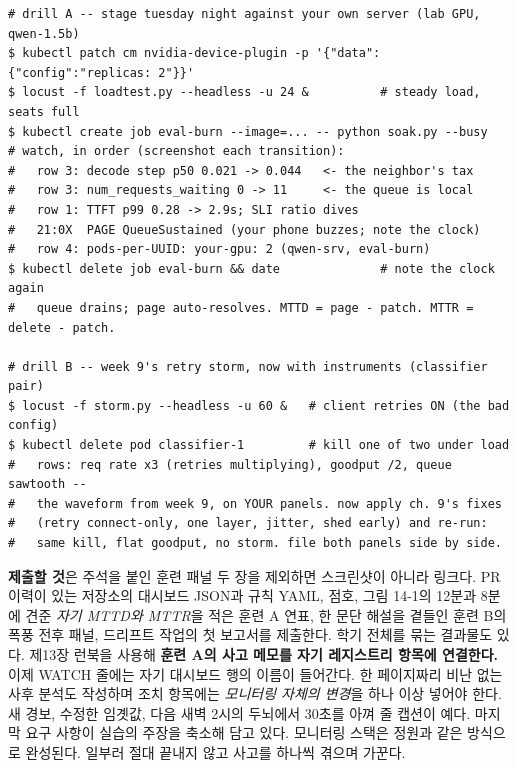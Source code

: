\begin{terminalbox}
\begin{Verbatim}[breaklines=true,breakanywhere=true,fontsize=\small,formatcom=\color{tbbtermfg},codes=\tbbcodeactive]
# drill A -- stage tuesday night against your own server (lab GPU, qwen-1.5b)
$ kubectl patch cm nvidia-device-plugin -p '{"data":{"config":"replicas: 2"}}'
$ locust -f loadtest.py --headless -u 24 &          # steady load, seats full
$ kubectl create job eval-burn --image=... -- python soak.py --busy
# watch, in order (screenshot each transition):
#   row 3: decode step p50 0.021 -> 0.044   <- the neighbor's tax
#   row 3: num_requests_waiting 0 -> 11     <- the queue is local
#   row 1: TTFT p99 0.28 -> 2.9s; SLI ratio dives
#   21:0X  PAGE QueueSustained (your phone buzzes; note the clock)
#   row 4: pods-per-UUID: your-gpu: 2 (qwen-srv, eval-burn)
$ kubectl delete job eval-burn && date              # note the clock again
#   queue drains; page auto-resolves. MTTD = page - patch. MTTR = delete - patch.

# drill B -- week 9's retry storm, now with instruments (classifier pair)
$ locust -f storm.py --headless -u 60 &   # client retries ON (the bad config)
$ kubectl delete pod classifier-1         # kill one of two under load
#   rows: req rate x3 (retries multiplying), goodput /2, queue sawtooth --
#   the waveform from week 9, on YOUR panels. now apply ch. 9's fixes
#   (retry connect-only, one layer, jitter, shed early) and re-run:
#   same kill, flat goodput, no storm. file both panels side by side.
\end{Verbatim}
\end{terminalbox}

\textbf{제출할 것}은 주석을 붙인 훈련 패널 두 장을 제외하면 스크린샷이 아니라 링크다. PR 이력이 있는 저장소의 대시보드 JSON과 규칙 YAML,  점호, 그림 14-1의 12분과 8분에 견준 \textit{자기 MTTD와 MTTR}을 적은 훈련 A 연표, 한 문단 해설을 곁들인 훈련 B의 폭풍 전후 패널, 드리프트 작업의 첫 보고서를 제출한다. 학기 전체를 묶는 결과물도 있다. 제13장 런북을 사용해 \textbf{훈련 A의 사고 메모를 자기 레지스트리 항목에 연결한다.} 이제 WATCH 줄에는 자기 대시보드 행의 이름이 들어간다. 한 페이지짜리 비난 없는 사후 분석도 작성하며 조치 항목에는 \textit{모니터링 자체의 변경}을 하나 이상 넣어야 한다. 새 경보, 수정한 임곗값, 다음 새벽 2시의 두뇌에서 30초를 아껴 줄 캡션이 예다. 마지막 요구 사항이 실습의 주장을 축소해 담고 있다. 모니터링 스택은 정원과 같은 방식으로 완성된다. 일부러 절대 끝내지 않고 사고를 하나씩 겪으며 가꾼다.

